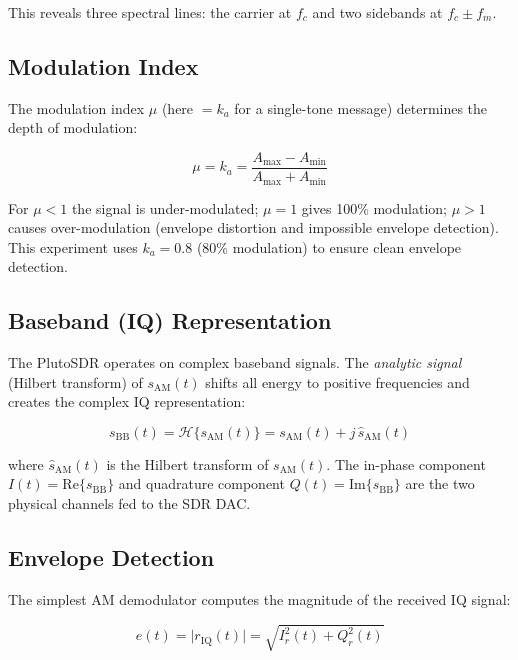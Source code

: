 \documentclass[12pt,a4paper]{article}
\begin{document}
This reveals three spectral lines: the carrier at $f_c$ and two sidebands at
$f_c \pm f_m$.

\subsection{Modulation Index}

The modulation index $\mu$ (here $= k_a$ for a single-tone message) determines
the depth of modulation:

\begin{equation}
  \mu = k_a = \frac{A_{\max} - A_{\min}}{A_{\max} + A_{\min}}
\end{equation}

For $\mu < 1$ the signal is under-modulated; $\mu = 1$ gives 100\% modulation;
$\mu > 1$ causes over-modulation (envelope distortion and impossible envelope
detection).  This experiment uses $k_a = 0.8$ (80\% modulation) to ensure
clean envelope detection.

\subsection{Baseband (IQ) Representation}

The PlutoSDR operates on complex baseband signals. The \emph{analytic signal}
(Hilbert transform) of $s_{\mathrm{AM}}(t)$ shifts all energy to positive
frequencies and creates the complex IQ representation:

\begin{equation}
  s_{\mathrm{BB}}(t) = \mathcal{H}\{s_{\mathrm{AM}}(t)\}
    = s_{\mathrm{AM}}(t) + j\,\hat{s}_{\mathrm{AM}}(t)
\end{equation}

\noindent where $\hat{s}_{\mathrm{AM}}(t)$ is the Hilbert transform of
$s_{\mathrm{AM}}(t)$.  The in-phase component $I(t)=\mathrm{Re}\{s_{\mathrm{BB}}\}$
and quadrature component $Q(t)=\mathrm{Im}\{s_{\mathrm{BB}}\}$ are the two
physical channels fed to the SDR DAC.

\subsection{Envelope Detection}

The simplest AM demodulator computes the magnitude of the received IQ signal:

\begin{equation}
  e(t) = \bigl|r_{\mathrm{IQ}}(t)\bigr| = \sqrt{I_r^2(t) + Q_r^2(t)}
\end{equation}
\end{document}
